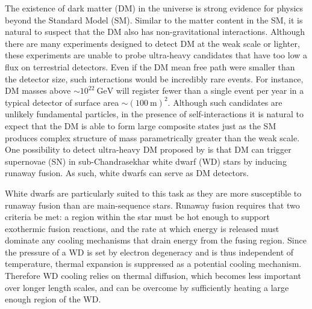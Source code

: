 \documentclass[twocolumn,preprintnumbers,amsmath,amssymb,prl, superscriptaddress]{revtex4}
\newcommand{\GeV}{\text{GeV}}
\begin{document}
The existence of dark matter (DM) in the universe is strong evidence for physics beyond the Standard Model (SM).
Similar to the matter content in the SM, it is natural to suspect that the DM also has non-gravitational interactions.
Although there are many experiments designed to detect DM at the weak scale or lighter, these experiments are unable to probe ultra-heavy candidates that have too low a flux on terrestrial detectors. 
Even if the DM mean free path were smaller than the detector size, such interactions would be incredibly rare events. 
For instance, DM masses above $\sim 10^{22} ~\GeV$ will register fewer than a single event per year in a typical detector of surface area $\sim (100 ~\text{m})^2$.
Although such candidates are unlikely fundamental particles, in the presence of self-interactions it is natural to expect that the DM is able to form large composite states just as the SM produces complex structure of mass parametrically greater than the weak scale. 
One possibility to detect ultra-heavy DM proposed by \cite{Graham:2015apa} is that DM can trigger supernovae (SN) in sub-Chandrasekhar white dwarf (WD) stars by inducing runaway fusion.
As such, white dwarfs can serve as DM detectors. 

White dwarfs are particularly suited to this task as they are more susceptible to runaway fusion than are main-sequence stars.
Runaway fusion requires that two criteria be met: a region within the star must be hot enough to support exothermic fusion reactions, and the rate at which energy is released must dominate any cooling mechanisms that drain energy from the fusing region.
Since the pressure of a WD is set by electron degeneracy and is thus independent of temperature, thermal expansion is suppressed as a potential cooling mechanism.
Therefore WD cooling relies on thermal diffusion, which becomes less important over longer length scales, and can be overcome by sufficiently heating a large enough region of the WD.
\end{document}
